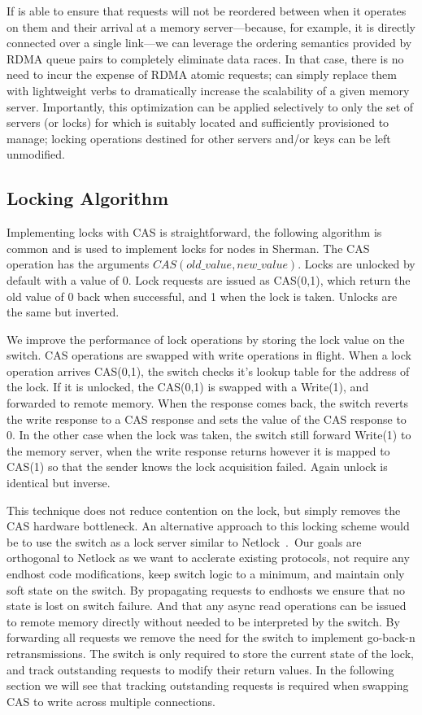 If {\sword} is able to ensure that requests will not be reordered between when
it operates on them and their arrival at a memory server---because, for example,
it is directly connected over a single link---we can leverage the ordering
semantics provided by RDMA queue pairs to completely eliminate data races.
In that case, there is no need to incur the expense of RDMA atomic requests;
{\sword} can simply replace them with lightweight verbs to dramatically increase
the scalability of a given memory server.  Importantly, this optimization can be
applied selectively to only the set of servers (or locks) for which {\sword} is
suitably located and sufficiently provisioned to manage; locking operations
destined for other servers and/or keys can be left unmodified.

\subsection{Locking Algorithm}
\label{sec:locking-algorithm}
Implementing locks with CAS is straightforward, the following algorithm is
common and is used to implement locks for nodes in Sherman. The CAS operation
has the arguments $CAS(old\_value,new\_value)$. Locks are unlocked by default
with a value of 0. Lock requests are issued as CAS(0,1), which return the old
value of 0 back when successful, and 1 when the lock is taken. Unlocks are the
same but inverted.

We improve the performance of lock operations by storing the lock value on the
switch. CAS operations are swapped with write operations in flight. When a lock
operation arrives CAS(0,1), the switch checks it's lookup table for the address
of the lock. If it is unlocked, the CAS(0,1) is swapped with a Write(1), and
forwarded to remote memory. When the response comes back, the switch reverts the
write response to a CAS response and sets the value of the CAS response to 0. In
the other case when the lock was taken, the switch still forward Write(1) to the
memory server, when the write response returns however it is mapped to CAS(1) so
that the sender knows the lock acquisition failed. Again unlock is identical but
inverse.

This technique does not reduce contention on the lock, but simply removes the
CAS hardware bottleneck. An alternative approach to this locking scheme would be
to use the switch as a lock server similar to
Netlock~\cite{netlock}.~Our goals are orthogonal to Netlock as we
want to acclerate existing protocols, not require any endhost code
modifications, keep switch logic to a minimum, and maintain only soft state on
the switch. By propagating requests to endhosts we ensure that no state is lost
on switch failure. And that any async read operations can be issued to remote
memory directly without needed to be interpreted by the switch.  By forwarding
all requests we remove the need for the switch to implement go-back-n
retransmissions. The switch is only required to store the current state of the
lock, and track outstanding requests to modify their return values. In the
following section we will see that tracking outstanding requests is required
when swapping CAS to write across multiple connections.

